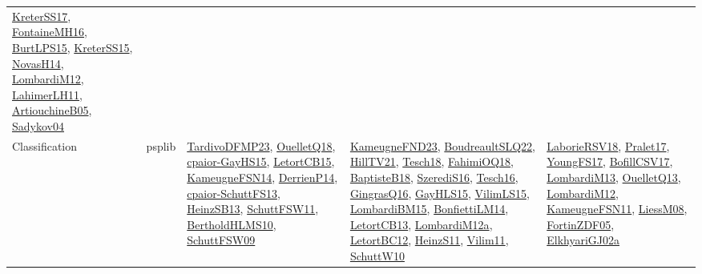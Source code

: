 {\begin{longtable}{lp{3cm}>{\raggedright}p{6cm}>{\raggedright}p{6cm}p{8cm}}
\href{articles/KreterSS17.pdf}{KreterSS17}\cite{KreterSS17}, \href{papers/FontaineMH16.pdf}{FontaineMH16}\cite{FontaineMH16}, \href{papers/BurtLPS15.pdf}{BurtLPS15}\cite{BurtLPS15}, \href{papers/KreterSS15.pdf}{KreterSS15}\cite{KreterSS15}, \href{articles/NovasH14.pdf}{NovasH14}\cite{NovasH14}, \href{articles/LombardiM12.pdf}{LombardiM12}\cite{LombardiM12}, \href{papers/LahimerLH11.pdf}{LahimerLH11}\cite{LahimerLH11}, \href{papers/ArtiouchineB05.pdf}{ArtiouchineB05}\cite{ArtiouchineB05}, \href{papers/Sadykov04.pdf}{Sadykov04}\cite{Sadykov04}\\
Classification & psplib & \href{papers/TardivoDFMP23.pdf}{TardivoDFMP23}\cite{TardivoDFMP23}, \href{papers/OuelletQ18.pdf}{OuelletQ18}\cite{OuelletQ18}, \href{papers/cpaior-GayHS15.pdf}{cpaior-GayHS15}\cite{cpaior-GayHS15}, \href{articles/LetortCB15.pdf}{LetortCB15}\cite{LetortCB15}, \href{articles/KameugneFSN14.pdf}{KameugneFSN14}\cite{KameugneFSN14}, \href{papers/DerrienP14.pdf}{DerrienP14}\cite{DerrienP14}, \href{papers/cpaior-SchuttFS13.pdf}{cpaior-SchuttFS13}\cite{cpaior-SchuttFS13}, \href{articles/HeinzSB13.pdf}{HeinzSB13}\cite{HeinzSB13}, \href{articles/SchuttFSW11.pdf}{SchuttFSW11}\cite{SchuttFSW11}, \href{papers/BertholdHLMS10.pdf}{BertholdHLMS10}\cite{BertholdHLMS10}, \href{papers/SchuttFSW09.pdf}{SchuttFSW09}\cite{SchuttFSW09} & \href{papers/KameugneFND23.pdf}{KameugneFND23}\cite{KameugneFND23}, \href{papers/BoudreaultSLQ22.pdf}{BoudreaultSLQ22}\cite{BoudreaultSLQ22}, \href{papers/HillTV21.pdf}{HillTV21}\cite{HillTV21}, \href{papers/Tesch18.pdf}{Tesch18}\cite{Tesch18}, \href{articles/FahimiOQ18.pdf}{FahimiOQ18}\cite{FahimiOQ18}, \href{articles/BaptisteB18.pdf}{BaptisteB18}\cite{BaptisteB18}, \href{papers/SzerediS16.pdf}{SzerediS16}\cite{SzerediS16}, \href{papers/Tesch16.pdf}{Tesch16}\cite{Tesch16}, \href{papers/GingrasQ16.pdf}{GingrasQ16}\cite{GingrasQ16}, \href{papers/GayHLS15.pdf}{GayHLS15}\cite{GayHLS15}, \href{papers/VilimLS15.pdf}{VilimLS15}\cite{VilimLS15}, \href{papers/LombardiBM15.pdf}{LombardiBM15}\cite{LombardiBM15}, \href{papers/BonfiettiLM14.pdf}{BonfiettiLM14}\cite{BonfiettiLM14}, \href{papers/LetortCB13.pdf}{LetortCB13}\cite{LetortCB13}, \href{articles/LombardiM12a.pdf}{LombardiM12a}\cite{LombardiM12a}, \href{papers/LetortBC12.pdf}{LetortBC12}\cite{LetortBC12}, \href{papers/HeinzS11.pdf}{HeinzS11}\cite{HeinzS11}, \href{papers/Vilim11.pdf}{Vilim11}\cite{Vilim11}, \href{papers/SchuttW10.pdf}{SchuttW10}\cite{SchuttW10} & \href{articles/LaborieRSV18.pdf}{LaborieRSV18}\cite{LaborieRSV18}, \href{papers/Pralet17.pdf}{Pralet17}\cite{Pralet17}, \href{papers/YoungFS17.pdf}{YoungFS17}\cite{YoungFS17}, \href{papers/BofillCSV17.pdf}{BofillCSV17}\cite{BofillCSV17}, \href{papers/LombardiM13.pdf}{LombardiM13}\cite{LombardiM13}, \href{papers/OuelletQ13.pdf}{OuelletQ13}\cite{OuelletQ13}, \href{articles/LombardiM12.pdf}{LombardiM12}\cite{LombardiM12}, \href{papers/KameugneFSN11.pdf}{KameugneFSN11}\cite{KameugneFSN11}, \href{articles/LiessM08.pdf}{LiessM08}\cite{LiessM08}, \href{papers/FortinZDF05.pdf}{FortinZDF05}\cite{FortinZDF05}, \href{papers/ElkhyariGJ02a.pdf}{ElkhyariGJ02a}\cite{ElkhyariGJ02a}\\

\end{longtable}}
